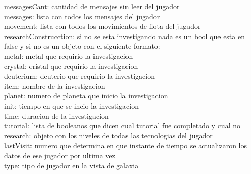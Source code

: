 \documentclass{article}
\newcommand\tab[1][1cm]{\hspace*{#1}}
\begin{document}
            \tab messagesCant: cantidad de mensajes sin leer del jugador\\
            \tab messages: lista con todos los mensajes del jugador\\
            \tab movement: lista con todos los movimientos de flota del jugador\\
            \tab researchConstrucction: si no se esta investigando nada es un bool que esta en false y si no es un objeto con el siguiente formato:\\
            \tab\tab metal: metal que requirio la investigacion\\
            \tab\tab crystal: cristal que requirio la investigacion\\
            \tab\tab deuterium: deuterio que requirio la investigacion\\
            \tab\tab item: nombre de la investigacion\\
            \tab\tab planet: numero de planeta que inicio la investigacion\\
            \tab\tab init: tiempo en que se incio la investigacion\\
            \tab\tab time: duracion de la investigacion\\
            \tab tutorial: lista de booleanos que dicen cual tutorial fue completado y cual no\\
            \tab research: objeto con los niveles de todas las tecnologias del jugador\\
            \tab lastVisit: numero que determina en que instante de tiempo se actualizaron los datos de ese jugador por ultima vez\\
            \tab type: tipo de jugador en la vista de galaxia\\
\end{document}
